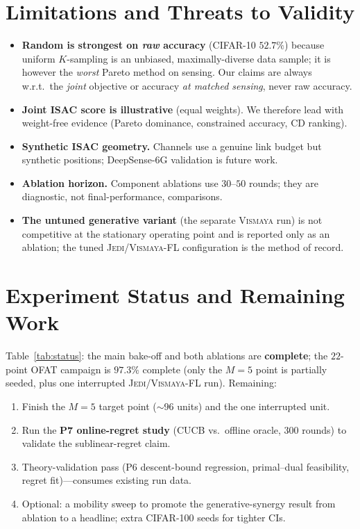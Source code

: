 \documentclass[journal,onecolumn,11pt]{IEEEtran}
\newcommand{\jedi}{\textsc{Jedi/Vismaya-FL}}
\begin{document}
\section{Limitations and Threats to Validity}
\begin{itemize}[leftmargin=1.4em,itemsep=1pt]
  \item \textbf{Random is strongest on \emph{raw} accuracy} (CIFAR-10 $52.7\%$) because
        uniform $K$-sampling is an unbiased, maximally-diverse data sample; it is however
        the \emph{worst} Pareto method on sensing. Our claims are always w.r.t.\ the
        \emph{joint} objective or accuracy \emph{at matched sensing}, never raw accuracy.
  \item \textbf{Joint ISAC score is illustrative} (equal weights). We therefore lead with
        weight-free evidence (Pareto dominance, constrained accuracy, CD ranking).
  \item \textbf{Synthetic ISAC geometry.} Channels use a genuine link budget but synthetic
        positions; DeepSense-6G validation is future work.
  \item \textbf{Ablation horizon.} Component ablations use $30$--$50$ rounds; they are
        diagnostic, not final-performance, comparisons.
  \item \textbf{The untuned generative variant} (the separate \textsc{Vismaya} run) is not
        competitive at the stationary operating point and is reported only as an ablation;
        the tuned \jedi{} configuration is the method of record.
\end{itemize}

\section{Experiment Status and Remaining Work}
\label{sec:status}
Table~\ref{tab:status}: the main bake-off and both ablations are \textbf{complete}; the
$22$-point OFAT campaign is $97.3\%$ complete (only the $M{=}5$ point is partially seeded,
plus one interrupted \jedi{} run). Remaining:
\begin{enumerate}[leftmargin=1.5em,itemsep=1pt]
  \item Finish the $M{=}5$ target point ($\sim$96 units) and the one interrupted unit.
  \item Run the \textbf{P7 online-regret study} (CUCB vs.\ offline oracle, $300$ rounds)
        to validate the sublinear-regret claim.
  \item Theory-validation pass (P6 descent-bound regression, primal--dual feasibility,
        regret fit)---consumes existing run data.
  \item Optional: a mobility sweep to promote the generative-synergy result from ablation
        to a headline; extra CIFAR-100 seeds for tighter CIs.
\end{enumerate}
\end{document}
